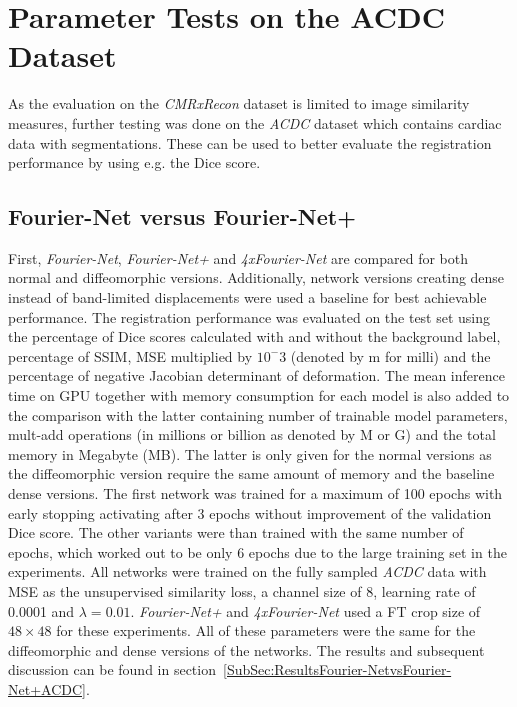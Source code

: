 \documentclass[english,version-2022-01]{uzl-thesis} %
\begin{document}
\section{Parameter Tests on the ACDC Dataset}
As the evaluation on the \emph{CMRxRecon} dataset is limited to image similarity measures, further testing was done on the \emph{ACDC} dataset which contains cardiac data with segmentations. These can be used to better evaluate the registration performance by using e.g. the Dice score.


\subsection{Fourier-Net versus Fourier-Net+} \label{SubSec:Fourier-NetvsFourier-Net+}
First, \emph{Fourier-Net}, \emph{Fourier-Net+} and \emph{4xFourier-Net} are compared for both normal and diffeomorphic versions. Additionally, network versions creating dense instead of band-limited displacements were used a baseline for best achievable performance. The registration performance was evaluated on the test set using the percentage of Dice scores calculated with and without the background label, percentage of SSIM, MSE multiplied by $10^-3$ (denoted by m for milli) and the percentage of negative Jacobian determinant of deformation. The mean inference time on GPU together with memory consumption for each model is also added to the comparison with the latter containing number of trainable model parameters, mult-add operations (in millions or billion as denoted by M or G) and the total memory in Megabyte (MB). The latter is only given for the normal versions as the diffeomorphic version require the same amount of memory and the baseline dense versions. The first network was trained for a maximum of 100 epochs with early stopping activating after 3 epochs without improvement of the validation Dice score. The other variants were than trained with the same number of epochs, which worked out to be only 6 epochs due to the large training set in the experiments. All networks were trained on the fully sampled \emph{ACDC} data with MSE as the unsupervised similarity loss, a channel size of 8, learning rate of 0.0001 and $\lambda=0.01$. \emph{Fourier-Net+} and \emph{4xFourier-Net} used a FT crop size of $48 \times 48$ for these experiments. All of these parameters were the same for the diffeomorphic and dense versions of the networks. The results and subsequent discussion can be found in section~\ref{SubSec:ResultsFourier-NetvsFourier-Net+ACDC}.
\end{document}
